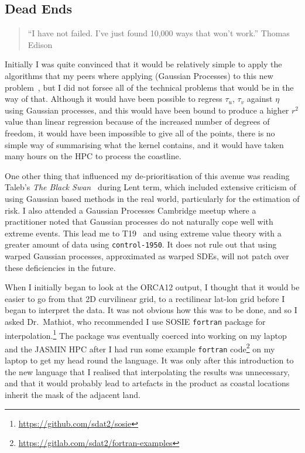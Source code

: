 
\subsection{Dead Ends}

\begin{quote}
``I have not failed. I've just found 10,000 ways that won't work.''
Thomas Edison
\end{quote}

Initially I was quite convinced that it would be relatively
simple to apply the algorithms that my peers where applying
(Gaussian Processes) to this new problem~\cite{LeMaitre2019gaussian}, but I did not
forsee all of the technical problems that would be in the way of that.
Although it would have been possible to regress $\tau_u$, $\tau_v$ against
$\eta$ using Gaussian processes, and this would have been bound to produce a
higher $r^2$ value than linear regression because of the increased number of
degrees of freedom, it would have been impossible to give all of the points,
there is no simple way of summarising what the kernel contains,
and it would have taken many hours on the HPC to process the coastline.

One other thing that influenced my de-prioritisation of this
avenue was reading Taleb's \textit{The Black Swan}~\cite{taleb2007black} during Lent
term, which included extensive criticism of using Gaussian based methods in the
real world, particularly for the estimation of risk.
I also attended a Gaussian Processes Cambridge meetup where a practitioner noted that
Gaussian processes do not naturally cope well with extreme
events. This lead me to T19~\cite{taleb2019statistical} and using extreme value
theory with a greater amount of data using \texttt{control-1950}.
It does not rule out that using warped Gaussian processes, approximated as
warped SDEs, will not patch over these deficiencies in the future.

When I initially began to look at the ORCA12 output,
I thought that it would be easier to go from that 2D
curvilinear grid, to a rectilinear lat-lon grid before
I began to interpret the data. It was not obvious how
this was to be done, and so I asked Dr.~Mathiot, who recommended
I use SOSIE \texttt{fortran} package for interpolation.\footnote{\url{https://github.com/sdat2/sosie}}
The package was eventually coerced into working on my laptop and the JASMIN
HPC after I had run some example \texttt{fortran}
code\footnote{\url{https://gitlab.com/sdat2/fortran-examples}} on my laptop
to get my head round the language. It was only after this introduction to
the new language that I realised that interpolating the results was
unnecessary, and that it would probably lead to artefacts in the product as coastal
locations inherit the mask of the adjacent land.

